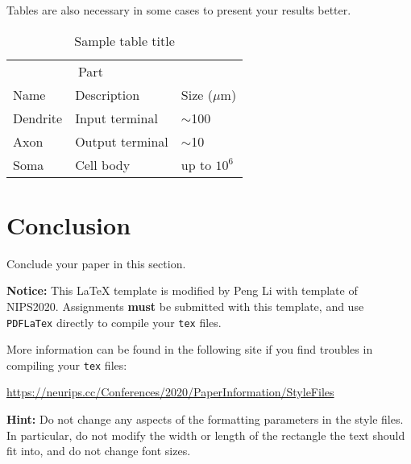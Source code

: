 \documentclass{article}
\begin{document}
Tables are also necessary in some cases to present your results better.
\begin{table}
  \caption{Sample table title}
  \label{sample-table}
  \centering
  \begin{tabular}{lll}
    \toprule
    \multicolumn{2}{c}{Part}                   \\
    \cmidrule(r){1-2}
    Name     & Description     & Size ($\mu$m) \\
    \midrule
    Dendrite & Input terminal  & $\sim$100     \\
    Axon     & Output terminal & $\sim$10      \\
    Soma     & Cell body       & up to $10^6$  \\
    \bottomrule
  \end{tabular}
\end{table}


\section{Conclusion}
Conclude your paper in this section.


\textbf{Notice:} This \LaTeX{} template is modified by Peng Li with template of NIPS2020. Assignments \textbf{must} be submitted with this template, and use \verb+PDFLaTex+ directly to compile your \verb+tex+ files.


More information can be found in the following site if you find troubles in compiling your \verb+tex+ files: 
\begin{center}
\url{https://neurips.cc/Conferences/2020/PaperInformation/StyleFiles}
\end{center}


\textbf{Hint:} Do not change any aspects of the formatting parameters in the style files.  In
particular, do not modify the width or length of the rectangle the text should
fit into, and do not change font sizes.



\end{document}
